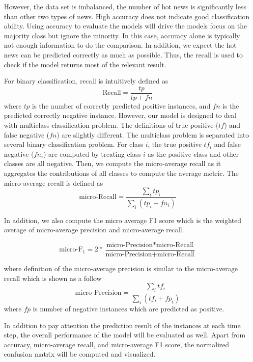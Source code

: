 However, the data set is imbalanced, the number of hot news is significantly less than other two types of news. High accuracy does not indicate good classification ability. Using accuracy to evaluate the models will drive the models focus on the majority class but ignore the minority. In this case, accuracy alone is typically not enough information to do the comparison. In addition, we expect the hot news can be predicted correctly as much as possible. Thus, the recall is used to check if the model returns most of the relevant result.

For binary classification, recall is intuitively defined as 
\begin{equation}
\mbox{Recall} = \frac{tp}{tp+fn}
\end{equation}
where $tp$ is the number of correctly predicted positive instances, and $fn$ is the predicted correctly negative instance. However, our model is designed to deal with multiclass classification problem. The definitions of true positive ($tf$) and false negative ($fn$) are slightly different. The multiclass problem is separated into several binary classification problem. For class $i$, the true positive $tf_i$ and false negative ($fn_i$) are computed by treating class $i$ as the positive class and other classes are all negative. Then, we compute the micro-average recall as it aggregates the contributions of all classes to compute the average metric. The micro-average recall is defined as~\cite{sokolova2009systematic} 
\begin{equation}
\mbox{micro-Recall} = \frac{\sum_i tp_i}{\sum_i(tp_i + fn_i)}
\end{equation}

In addition, we also compute the micro average F1 score which is the weighted average of micro-average precision and micro-average recall.

\begin{equation}
\mbox{micro-F}_1 = 2 * \frac{\mbox{micro-Precision} * \mbox{micro-Recall}}{\mbox{micro-Precision} + \mbox{micro-Recall}}
\end{equation}

where definition of the micro-average precision is similar to the micro-average recall which is shown as a follow
\begin{equation}
\mbox{micro-Precision} = \frac{\sum_i tf_i}{\sum_i(tf_i + fp_i)}
\end{equation}
where $fp$ is number of negative instances which are predicted as positive.

In addition to pay attention the prediction result of the instances at each time step, the overall performance of the model will be evaluated as well. Apart from accuracy, micro-average recall, and micro-average F1 score, the normalized confusion matrix will be computed and visualized.

